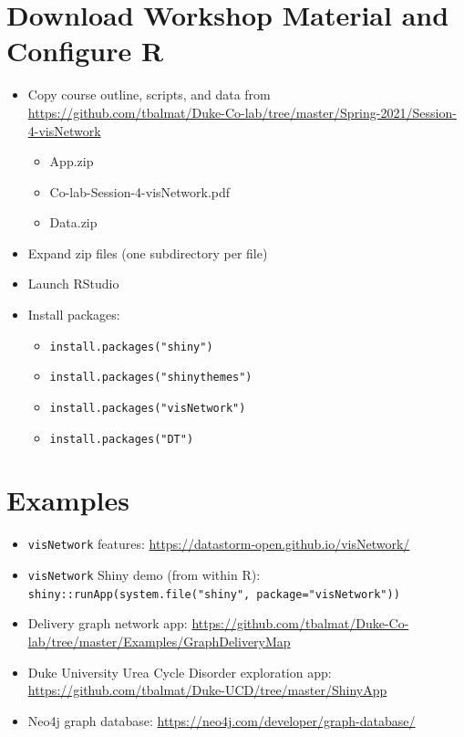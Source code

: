 \documentclass[10pt, letterpaper]{article}
\begin{document}
\begin{spacing}{1.0}

\section{Download Workshop Material and Configure R}\label{sec:accesworkshopmaterial}

\begin{itemize}[noitemsep]
    \item Copy course outline, scripts, and data from\\ \url{https://github.com/tbalmat/Duke-Co-lab/tree/master/Spring-2021/Session-4-visNetwork}
    \begin{itemize}[noitemsep]
        \item App.zip
        \item Co-lab-Session-4-visNetwork.pdf
        \item Data.zip
    \end{itemize}
    \item Expand zip files (one subdirectory per file)
    \item Launch RStudio
    \item Install packages:
    \begin{itemize}[noitemsep]
        \item \texttt{install.packages("shiny")}
        \item \texttt{install.packages("shinythemes")}
        \item \texttt{install.packages("visNetwork")}
        \item \texttt{install.packages("DT")}
    \end{itemize}
\end{itemize}


\section{Examples}\label{sec:examples}

\begin{itemize}[noitemsep]
  \item \texttt{visNetwork} features:  \url{https://datastorm-open.github.io/visNetwork/}
  \item \texttt{visNetwork} Shiny demo (from within R):  \texttt{shiny::runApp(system.file("shiny", package="visNetwork"))}  \item Delivery graph network app: \url{https://github.com/tbalmat/Duke-Co-lab/tree/master/Examples/GraphDeliveryMap}
  \item Duke University Urea Cycle Disorder exploration app:  \url{https://github.com/tbalmat/Duke-UCD/tree/master/ShinyApp}
  \item Neo4j graph database:  \url{https://neo4j.com/developer/graph-database/}
\end{itemize}



\end{spacing}
\end{document}
